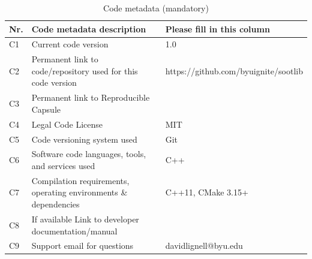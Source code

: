 \documentclass[preprint,letterpaper]{elsarticle}
\begin{document}
\begin{table}
\begin{tabular}{|l|p{6.5cm}|p{6.5cm}|}
\hline
\textbf{Nr.} & \textbf{Code metadata description} & \textbf{Please fill in this column} \\
\hline
C1 & Current code version & 1.0 \\
\hline
C2 & Permanent link to code/repository used for this code version & https://github.com/byuignite/sootlib \\
\hline
C3  & Permanent link to Reproducible Capsule & \\
\hline
C4 & Legal Code License & MIT \\
\hline
C5 & Code versioning system used & Git \\
\hline
C6 & Software code languages, tools, and services used & C++ \\
\hline
C7 & Compilation requirements, operating environments \& dependencies & C++11, CMake 3.15+\\
\hline
C8 & If available Link to developer documentation/manual &  \\
\hline
C9 & Support email for questions & davidlignell@byu.edu \\
\hline
\end{tabular}
\caption{Code metadata (mandatory)}
\end{table}

%
%
\end{document}
